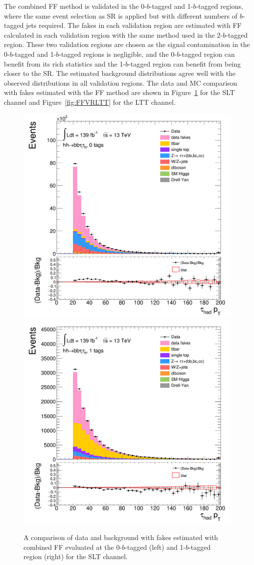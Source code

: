 The combined FF method is validated in
the 0-$b$-tagged and 1-$b$-tagged regions, where the same event selection as SR 
is applied but with different numbers of $b$-tagged jets required. 
The fakes in each validation region are estimated with FF calculated in each validation region 
with the same method used in the 2-$b$-tagged region.
These two validation regions are chosen as 
the signal contamination in the 0-$b$-tagged 
and 1-$b$-tagged regions is negligible,
and the 0-$b$-tagged region can benefit from its rich statistics 
and the 1-$b$-tagged region can benefit from being closer to the SR.
The estimated background distributions agree well 
with the observed distributions in all validation regions.
The data and MC comparison with fakes estimated with the FF method 
are shown in Figure~\ref{fig:FFVRSLT} for the SLT channel and
Figure~\ref{fig:FFVRLTT} for the LTT channel. 

\begin{figure}[htbp]
\centering
\includegraphics[width=.4\textwidth]{DiHiggs/plots/FF_CRs/SR_SLT_datafakes/HNone/BDTVarsHighMbb/0/C_0tag2pjet_0ptv_TauPt.png}
\includegraphics[width=.4\textwidth]{DiHiggs/plots/FF_CRs/SR_SLT_datafakes/HNone/BDTVarsHighMbb/1/C_1tag2pjet_0ptv_TauPt.png} \\
\caption{A comparison of data and background with fakes estimated with combined FF evaluated at the 0-$b$-tagged (left) 
and 1-$b$-tagged region (right) for the SLT channel. }
\label{fig:FFVRSLT}
\end{figure}


